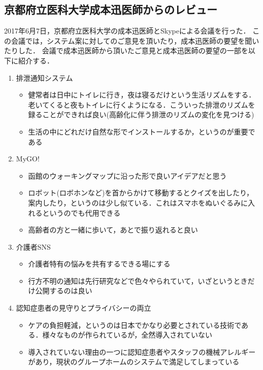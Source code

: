 \documentclass[../report]{subfiles}
\begin{document}
\subsection{京都府立医科大学成本迅医師からのレビュー}  \label{sec:4_hyouka_before3}
2017年6月7日，京都府立医科大学の成本迅医師とSkypeによる会議を行った．
この会議では，システム案に対してのご意見を頂いたり，成本迅医師の要望を聞いたりした．
会議で成本迅医師から頂いたご意見と成本迅医師の要望の一部を以下に紹介する．

\begin{enumerate}
    \item[] 排泄通知システム
\begin{itemize}
    \item 健常者は日中にトイレに行き，夜は寝るだけという生活リズムをする．老いてくると夜もトイレに行くようになる．こういった排泄のリズムを録ることができれば良い(高齢化に伴う排泄のリズムの変化を見つける)
    \item 生活の中にどれだけ自然な形でインストールするか，というのが重要である
\end{itemize}

    \item[] MyGO!
\begin{itemize}
    \item 函館のウォーキングマップに沿った形で良いアイデアだと思う
    \item ロボット(ロボホンなど)を首からかけて移動するとクイズを出したり，案内したり，というのは少し似ている．これはスマホをぬいぐるみに入れるというのでも代用できる
    \item 高齢者の方と一緒に歩いて，あとで振り返れると良い
\end{itemize}

    \item[] 介護者SNS
\begin{itemize}
    \item 介護者特有の悩みを共有するできる場にする
    \item 行方不明の通知は先行研究などで色々やられていて，いざというときだけ公開するのは良い
\end{itemize}

    \item[] 認知症患者の見守りとプライバシーの両立
\begin{itemize}
    \item ケアの負担軽減，というのは日本でかなり必要とされている技術である．様々なものが作られているが，全然導入されていない
    \item 導入されていない理由の一つに認知症患者やスタッフの機械アレルギーがあり，現状のグループホームのシステムで満足してしまっている
\end{itemize}


\end{enumerate}
\end{document}
